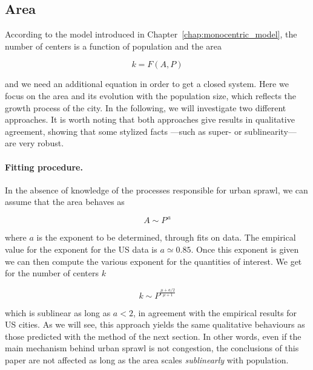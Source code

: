 \subsection{Area}

According to the model introduced in Chapter~\ref{chap:monocentric_model}, the number of centers is a function of population and the area

\begin{equation}
    k = F\left(A,P\right)
\end{equation}

and we need an additional equation in order to get a closed system. Here we
focus on the area and its evolution with the population size, which reflects the
growth process of the city. In the following, we will investigate two different
approaches. It is worth noting that both approaches give results in qualitative
agreement, showing that some stylized facts ---such as super- or sublinearity---
are very robust.\\ 

\paragraph{Fitting procedure.}

In the absence of knowledge of the processes responsible for urban sprawl, we
can assume that the area behaves as 

\begin{equation}
    A \sim P^{\,a}
    \label{eq:fit}
\end{equation}

where $a$ is the exponent to be determined, through fits on data. The empirical
value for the exponent for the US data is $a\simeq 0.85$. Once this exponent is
given we can then compute the various exponent for the quantities of interest.
We get for the number of centers $k$

\begin{equation}
    k \sim P^{\frac{\mu + a/2}{\mu+1}}
\end{equation}

which is sublinear as long as $a<2$, in agreement with the empirical results for
US cities. As we will see, this approach yields the same qualitative behaviours
as those predicted with the method of the next section. In other words, even if
the main mechanism behind urban sprawl is not congestion, the conclusions of
this paper are not affected as long as the area scales \emph{sublinearly} with
population.\\


